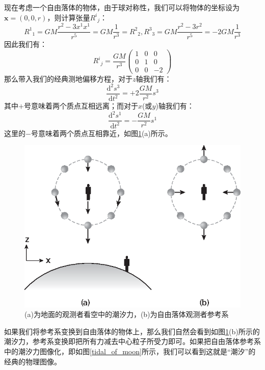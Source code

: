 \documentclass[hyperref, UTF8, a4paper]{ctexart}
\begin{document}
现在考虑一个自由落体的物体，由于球对称性，我们可以将物体的坐标设为$\boldsymbol{x} =(0,0,r)$，则计算张量$R^{i}{}_{j}$：
\begin{equation*}
	R^{1}{}_{1} =GM\frac{r^{2} -3x^{1} x^{1}}{r^{5}} =GM\frac{1}{r^{3}} =R^{2}{}_{2} ,R^{3}{}_{3} =GM\frac{r^{2} -3r^{2}}{r^{5}} =-2GM\frac{1}{r^{3}}
\end{equation*}
因此我们有：
\begin{equation*}
	R^{i}{}_{j} =\frac{GM}{r^{3}}\begin{pmatrix}
		1 & 0 & 0\\
		0 & 1 & 0\\
		0 & 0 & -2
	\end{pmatrix}
\end{equation*}
那么带入我们的经典测地偏移方程，对于$z$轴我们有：
\begin{equation*}
	\frac{\mathrm{d}^{2} s^{3}}{\mathrm{d} t^{2}} =+2\frac{GM}{r^{2}} s^{3}
\end{equation*}
其中$+$号意味着两个质点互相远离；而对于$x$(或$y$)轴我们有：
\begin{equation*}
	\frac{\mathrm{d}^{2} s^{1}}{\mathrm{d} t^{2}} =-\frac{GM}{r^{2}} s^{1}
\end{equation*}
这里的$-$号意味着两个质点互相靠近，如图\ref{tidal_of_falling_obj}(a)所示。
\begin{figure}
	\centering
	\includegraphics{tidal_of_falling_obj.eps}
	\caption{(a)为地面的观测者看空中的潮汐力，(b)为自由落体观测者参考系}
	\label{tidal_of_falling_obj}
\end{figure}
如果我们将参考系变换到自由落体的物体上，那么我们自然会看到如图\ref{tidal_of_falling_obj}(b)所示的潮汐力，参考系变换即把所有力减去中心粒子所受力即可。如果把自由落体参考系中的潮汐力图像化，即如图\ref{tidal_of_moon}所示，我们可以看到这就是“潮汐”的经典的物理图像。
\end{document}
